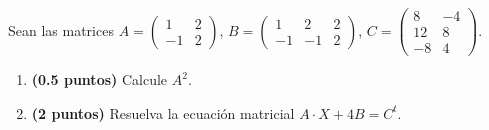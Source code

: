 
Sean las matrices $A=\begin{pmatrix}1&2\\-1&2\end{pmatrix}$, $B=\begin{pmatrix}1&2&2\\-1&-1&2\end{pmatrix}$, $C=\begin{pmatrix}8&-4\\12&8\\-8&4\end{pmatrix}$.
\begin{enumerate}[label=\alph*)]
\item \textbf{(0.5 puntos)} Calcule $A^2$.
\item \textbf{(2 puntos)} Resuelva la ecuación matricial $A\cdot X+4B=C^t$.
\end{enumerate}
